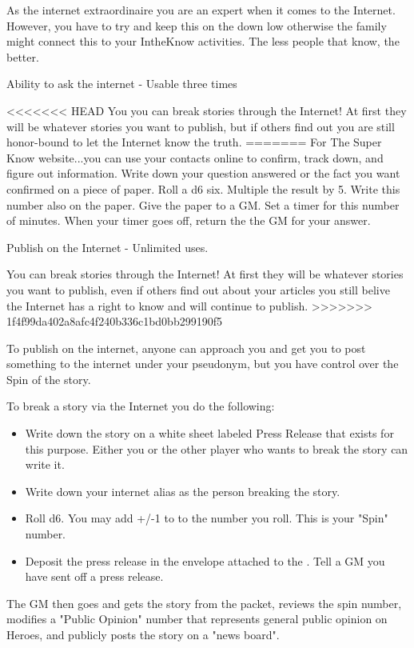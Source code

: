 \documentclass[green]{LRSguildcamp1}
\begin{document}
\name{\gInternetPR{}}

As \cTween{} the internet extraordinaire you are an expert when it comes to the Internet. However, you have to try and keep this on the down low otherwise the family might connect this to your IntheKnow activities. The less people that know, the better. 

Ability to ask the internet - Usable three times

<<<<<<< HEAD
You you can break stories through the Internet! At first they will be whatever stories you want to publish, but if others find out you are still honor-bound to let the Internet know the truth. 
=======
For The Super Know website...you can use your contacts online to confirm, track down, and figure out information. Write down your question answered or the fact you want confirmed on a piece of paper. Roll a d6 six. Multiple the result by 5. Write this number also on the paper. Give the paper to a GM. Set a timer for this number of minutes. When your timer goes off, return the the GM for your answer. 

Publish on the Internet - Unlimited uses.

You can break stories through the Internet! At first they will be whatever stories you want to publish, even if others find out about your articles you still belive the Internet has a right to know and will continue to publish. 
>>>>>>> 1f4f99da402a8afc4f240b336c1bd0bb299190f5

To publish on the internet, anyone can approach you and get you to post something to the internet under your pseudonym, but you have control over the Spin of the story. 

To break a story via the Internet you do the following:
\begin {itemize}
\item Write down the story on a white sheet labeled Press Release that exists for this purpose. Either you or the other player who wants to break the story can write it. 
\item Write down your internet alias as the person breaking the story.  
\item Roll d6.  You may add +/-1 to to the number you roll. This is your "Spin" number.
\item Deposit the press release in the envelope attached to the \sComputer{}. 
Tell a GM you have sent off a press release.
\end{itemize}

The GM then goes and gets the story from the packet, reviews the spin number, modifies a "Public Opinion" number that represents general public opinion on Heroes, and publicly posts the story on a "news board". 
\end{document}
